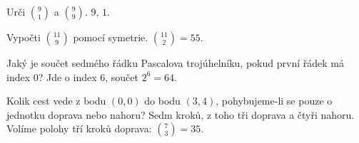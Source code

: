 \documentclass[11pt,a4paper]{article}
\begin{document}

\begin{zadaniReseniBox}[title={Samostatná práce 1}]
Urči $\binom91$ a $\binom99$.
\tcblower
$9$, $1$.
\end{zadaniReseniBox}



\begin{zadaniReseniBox}[title={Samostatná práce 2}]
Vypočti $\binom{11}{9}$ pomocí symetrie.
\tcblower
$\binom{11}{2}=55$.
\end{zadaniReseniBox}



\begin{zadaniReseniBox}[title={Samostatná práce 3}]
Jaký je součet sedmého řádku Pascalova trojúhelníku, pokud první řádek má index 0?
\tcblower
Jde o index $6$, součet $2^6=64$.
\end{zadaniReseniBox}




\begin{zadaniReseniBox}[title={Rozšíření 1}]
Kolik cest vede z bodu $(0,0)$ do bodu $(3,4)$, pohybujeme-li se pouze o jednotku doprava nebo nahoru?
\tcblower
Sedm kroků, z toho tři doprava a čtyři nahoru. Volíme polohy tří kroků doprava: $\binom73=35$.
\end{zadaniReseniBox}




\end{document}
